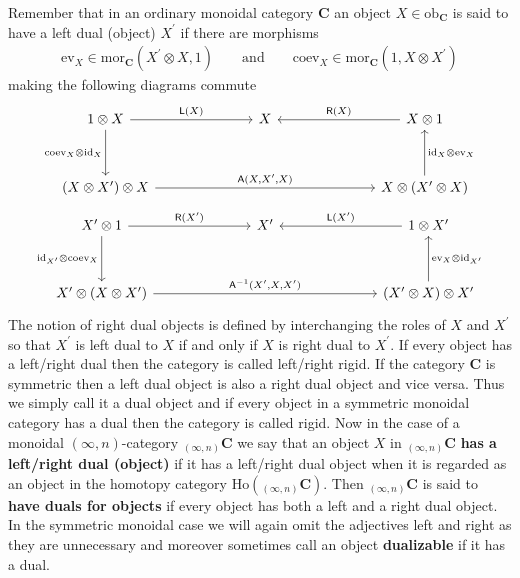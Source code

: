 Remember that in an ordinary monoidal category $\mathbf{C}$ an object $X \in \mathrm{ob}_{\mathbf{C}}$ is said to have a left dual (object) $X^{\prime}$ if there are morphisms
\begin{align*}
  \mathrm{ev}_{X}
  \in
  \mathrm{mor}_{\mathbf{C}}
  \left(
    X^{\prime} \otimes X
    ,
    1
  \right)
  \qquad
  \text{and}
  \qquad
  \mathrm{coev}_{X}
  \in
  \mathrm{mor}_{\mathbf{C}}
  \left(
    1
    ,
    X \otimes X^{\prime}
  \right)
\end{align*}
making the following diagrams commute
\begin{equation*}
\begin{tikzcd}[row sep=3.3em,column sep=7em]
  1 \otimes X
  \ar{r}{\mathsf{L}(X)}
  \ar{d}[swap]{\mathrm{coev}_{X} \otimes \mathrm{id}_{X}}
  &
  X
  &
  X \otimes 1
  \ar{l}[swap]{\mathsf{R}(X)}
  \\
  (X \otimes X^{\prime}) \otimes X
  \ar{rr}{\mathsf{A}(X,X^{\prime},X)}
  &
  &
  X \otimes (X^{\prime} \otimes X)
  \ar{u}[swap]{\mathrm{id}_{X} \otimes \mathrm{ev}_{X}}
\end{tikzcd}
\end{equation*}
\begin{equation*}
\begin{tikzcd}[row sep=3.3em,column sep=7em]
  X^{\prime} \otimes 1
  \ar{r}{\mathsf{R}(X^{\prime})}
  \ar{d}[swap]{\mathrm{id}_{X^{\prime}} \otimes \mathrm{coev}_{X}}
  &
  X^{\prime}
  &
  1 \otimes X^{\prime}
  \ar{l}[swap]{\mathsf{L}(X^{\prime})}
  \\
  X^{\prime} \otimes (X \otimes X^{\prime})
  \ar{rr}{\mathsf{A}^{-1}(X^{\prime},X,X^{\prime})}
  &
  &
  (X^{\prime} \otimes X) \otimes X^{\prime}
  \ar{u}[swap]{\mathrm{ev}_{X} \otimes \mathrm{id}_{X^{\prime}}}
\end{tikzcd}
\end{equation*}
The notion of right dual objects is defined by interchanging the roles of $X$ and $X^{\prime}$ so that $X^{\prime}$ is left dual to $X$ if and only if $X$ is right dual to $X^{\prime}$. If every object has a left/right dual then the category is called left/right rigid. If the category $\mathbf{C}$ is symmetric then a left dual object is also a right dual object and vice versa. Thus we simply call it a dual object and if every object in a symmetric monoidal category has a dual then the category is called rigid. Now in the case of a monoidal $(\infty,n)$-category ${_{(\infty,n)}}\mathbf{C}$ we say that an object $X$ in ${_{(\infty,n)}}\mathbf{C}$ \textbf{has a left/right dual (object)} if it has a left/right dual object when it is regarded as an object in the homotopy category $\mathrm{Ho}({_{(\infty,n)}}\mathbf{C})$. Then ${_{(\infty,n)}}\mathbf{C}$ is said to \textbf{have duals for objects} if every object has both a left and a right dual object. In the symmetric monoidal case we will again omit the adjectives left and right as they are unnecessary and moreover sometimes call an object \textbf{dualizable} if it has a dual.

